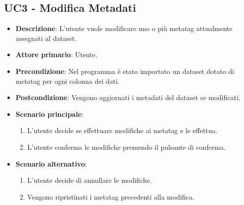 \newpage
\subsection{UC3 - Modifica Metadati}
\label{subsec:uc3}


\begin{itemize}
    \item \textbf{Descrizione}: L’utente vuole modificare uno o più metatag attualmente assegnati al dataset.
	
    \item \textbf{Attore primario}: Utente.
    
    \item \textbf{Precondizione}:   Nel programma è stato importato un dataset dotato di metatag 
                                    per ogni colonna dei dati.

    \item \textbf{Postcondizione}:  Vengono aggiornati i metadati del dataset se modificati.

	\item \textbf{Scenario principale}:
		\begin{enumerate}
			\item L'utente decide se effettuare modifiche ai metatag e le effettua.
			\item L'utente conferma le modifiche premendo il pulsante di conferma.
        \end{enumerate}
    \item \textbf{Scenario alternativo}:
		\begin{enumerate}
			\item L'utente decide di annullare le modifiche.
			\item Vengono ripristinati i metatag precedenti alla modifica.
        \end{enumerate}

    
    

\end{itemize}
